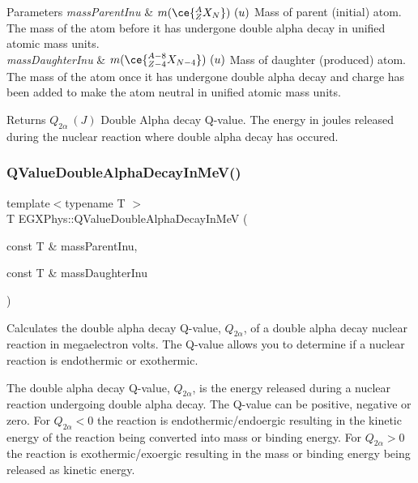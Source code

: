 \begin{DoxyParams}{Parameters}
{\em mass\+Parent\+Inu} & $m(\ce{ ^{A}_{Z}X_{N} })\ (u)$ Mass of parent (initial) atom. The mass of the atom before it has undergone double alpha decay in unified atomic mass units. \\
\hline
{\em mass\+Daughter\+Inu} & $m(\ce{ ^{A-8}_{Z{-4}}X_{N-4} })\ (u)$ Mass of daughter (produced) atom. The mass of the atom once it has undergone double alpha decay and charge has been added to make the atom neutral in unified atomic mass units. \\
\hline
\end{DoxyParams}
\begin{DoxyReturn}{Returns}
$Q_{2\alpha}\ (J)$ Double Alpha decay Q-\/value. The energy in joules released during the nuclear reaction where double alpha decay has occured. 
\end{DoxyReturn}
\mbox{\label{group___q_value_ga9bc6e8f493ee3769eb6eea0ac7cbdc61}} 
\subsubsection{\texorpdfstring{Q\+Value\+Double\+Alpha\+Decay\+In\+Me\+V()}{QValueDoubleAlphaDecayInMeV()}}
{\footnotesize\ttfamily template$<$typename T $>$ \\
T E\+G\+X\+Phys\+::\+Q\+Value\+Double\+Alpha\+Decay\+In\+MeV (\begin{DoxyParamCaption}\item[{const T \&}]{mass\+Parent\+Inu,  }\item[{const T \&}]{mass\+Daughter\+Inu }\end{DoxyParamCaption})}



Calculates the double alpha decay Q-\/value, $Q_{2\alpha}$, of a double alpha decay nuclear reaction in megaelectron volts. The Q-\/value allows you to determine if a nuclear reaction is endothermic or exothermic. 

The double alpha decay Q-\/value, $Q_{2\alpha}$, is the energy released during a nuclear reaction undergoing double alpha decay. The Q-\/value can be positive, negative or zero. For $Q_{2\alpha} < 0$ the reaction is endothermic/endoergic resulting in the kinetic energy of the reaction being converted into mass or binding energy. For $Q_{2\alpha} > 0$ the reaction is exothermic/exoergic resulting in the mass or binding energy being released as kinetic energy.


